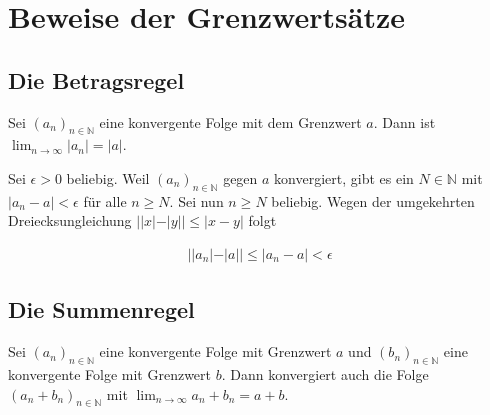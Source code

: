 \documentclass[fontsize=9pt,
               parskip=half-,
               DIV=14,
               listof=chapterentry,
               tocflat]{scrbook}
\begin{document}
\section{Beweise der Grenzwertsätze}

\subsection{Die Betragsregel}

\begin{theorem*}
Sei $(a_{n})_{n\in \mathbb {N} }$ eine konvergente Folge mit dem Grenzwert $a$. Dann ist $\lim _{n\rightarrow \infty }|a_{n}|=|a|$.

\end{theorem*}

\begin{proof*}
Sei $\epsilon >0$ beliebig. Weil $(a_{n})_{n\in \mathbb {N} }$ gegen $a$ konvergiert, gibt es ein $N\in \mathbb {N} $ mit $|a_{n}-a|<\epsilon $ für alle $n\geq N$. Sei nun $n\geq N$ beliebig. Wegen der umgekehrten Dreiecksungleichung $||x|-|y||\leq |x-y|$ folgt

\begin{align*}
||a_{n}|-|a||\leq |a_{n}-a|<\epsilon 
\end{align*}

\end{proof*}

\subsection{Die Summenregel}

\begin{theorem*}
Sei $(a_{n})_{n\in \mathbb {N} }$ eine konvergente Folge mit Grenzwert $a$ und $(b_{n})_{n\in \mathbb {N} }$ eine konvergente Folge mit Grenzwert $b$. Dann konvergiert auch die Folge $(a_{n}+b_{n})_{n\in \mathbb {N} }$ mit $\lim _{n\rightarrow \infty }a_{n}+b_{n}=a+b$.

\end{theorem*}
\end{document}
